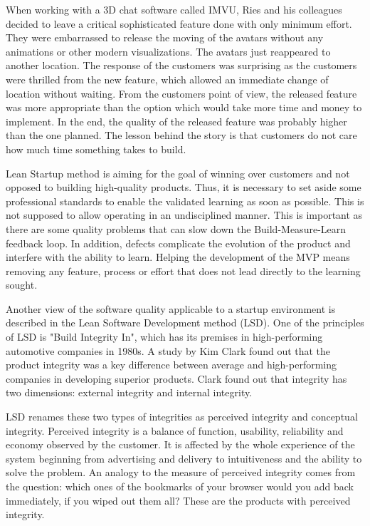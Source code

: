 When working with a 3D chat software called IMVU, Ries and his colleagues decided to leave a critical sophisticated feature done with only minimum effort. They were embarrassed to release the moving of the avatars without any animations or other modern visualizations. The avatars just reappeared to another location. The response of the customers was surprising as the customers were thrilled from the new feature, which allowed an immediate change of location without waiting. From the customers point of view, the released feature was more appropriate than the option which would take more time and money to implement. In the end, the quality of the released feature was probably higher than the one planned. The lesson behind the story is that customers do not care how much time something takes to build.

Lean Startup method is aiming for the goal of winning over customers and not opposed to building high-quality products. Thus, it is necessary to set aside some professional standards to enable the validated learning as soon as possible. This is not supposed to allow operating in an undisciplined manner. This is important as there are some quality problems that can slow down the Build-Measure-Learn feedback loop. In addition, defects complicate the evolution of the product and interfere with the ability to learn. Helping the development of the MVP means removing any feature, process or effort that does not lead directly to the learning sought.~\cite{ries2011lean}

Another view of the software quality applicable to a startup environment is described in the Lean Software Development method (LSD). One of the principles of LSD is "Build Integrity In", which has its premises in high-performing automotive companies in 1980s. A study by Kim Clark found out that the product integrity was a key difference between average and high-performing companies in developing superior products. Clark found out that integrity has two dimensions: external integrity and internal integrity.~\cite{clark1991product}

LSD renames these two types of integrities as perceived integrity and conceptual integrity. Perceived integrity is a balance of function, usability, reliability and economy observed by the customer. It is affected by the whole experience of the system beginning from advertising and delivery to intuitiveness and the ability to solve the problem. An analogy to the measure of perceived integrity comes from the question: which ones of the bookmarks of your browser would you add back immediately, if you wiped out them all? These are the products with perceived integrity.

